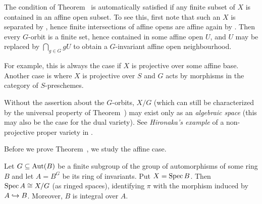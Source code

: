 \documentclass[a4paper,parskip=half,numbers=enddot, DIV=12]{scrreprt}
\begin{document}
\begin{rem}
	\begin{alphanumerate}
		\item The condition of Theorem~ is automatically satisfied if any finite subset of $X$ is contained in an affine open subset. To see this, first note that such an $X$ is separated by \cite[Fact~1.5.5]{alggeo1}, hence finite intersections of affine opens are affine again by \cite[Proposition~1.5.4]{alggeo1}. Then every $G$-orbit is a finite set, hence contained in some affine open $U$, and $U$ may be replaced by $\bigcap_{g\in G}gU$ to obtain a $G$-invariant affine open neighbourhood.
		
		For example, this is always the case if $X$ is projective over some affine base. Another case is where $X$ is projective over $S$ and $G$ acts by morphisms in the category of $S$-preschemes.
		\item Without the assertion about the $G$-orbits, $X/G$ (which can still be characterized by the universal property of Theorem~) may exist only as an \emph{algebraic space} (this may also be the case for the dual variety). See \emph{Hironaka's example} of  a non-projective proper variety in \cite[Ch.\:III Exercise 5.9]{hartshorne}.
	\end{alphanumerate}
\end{rem}
Before we prove Theorem~, we study the affine case.
\begin{lem}
	Let $G\subseteq \operatorname{Aut}(B)$ be a finite subgroup of the group of automorphisms of some ring $B$ and let $A=B^G$ be its ring of invariants. Put $X=\operatorname{Spec} B$. Then $\operatorname{Spec} A\cong X/G$ (as ringed spaces), identifying $\pi$ with the morphism induced by $A\monomorphism B$. Moreover, $B$ is integral over $A$.
\end{lem}
\end{document}
